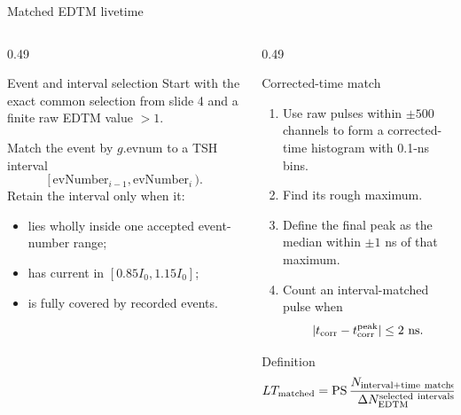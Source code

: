 \documentclass[aspectratio=169,11pt]{beamer}
\begin{document}
\begin{frame}{Matched EDTM livetime}
\begin{columns}[T,onlytextwidth]
  \begin{column}{0.49\textwidth}
    \begin{block}{Event and interval selection}
    \footnotesize
    Start with the exact common selection from slide 4 and a finite raw EDTM value \(>1\).
    
    \vspace{2mm}
    Match the event by \(g.\mathrm{evnum}\) to a TSH interval
    \[
       [\,\mathrm{evNumber}_{i-1},\mathrm{evNumber}_{i}\,).
    \]
    Retain the interval only when it:
    \begin{itemize}\setlength\itemsep{1mm}
      \item lies wholly inside one accepted event-number range;
      \item has current in \([0.85I_0,1.15I_0]\);
      \item is fully covered by recorded events.
    \end{itemize}
    \end{block}
  \end{column}
  \begin{column}{0.49\textwidth}
    \begin{block}{Corrected-time match}
    \footnotesize
    \begin{enumerate}\setlength\itemsep{1mm}
      \item Use raw pulses within \(\pm500\) channels to form a corrected-time histogram with 0.1-ns bins.
      \item Find its rough maximum.
      \item Define the final peak as the median within \(\pm1\) ns of that maximum.
      \item Count an interval-matched pulse when
      \[
        |t_{\rm corr}-t_{\rm corr}^{\rm peak}|\le2~\mathrm{ns}.
      \]
    \end{enumerate}
    \end{block}
    \begin{block}{Definition}
    \small
    \[
      LT_{\rm matched}=
      \mathrm{PS}\,
      \frac{N_{\rm interval+time\ matched}}
           {\Delta N_{\rm EDTM}^{\rm selected\ intervals}}.
    \]
    \end{block}
  \end{column}
\end{columns}
\end{frame}
\end{document}
